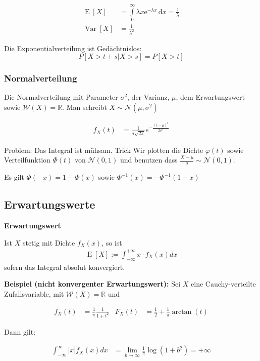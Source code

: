\documentclass[25pt]{sciposter}
\newcommand{\R}{\mathbb{R}}
\newcommand{\W}{\mathcal{W}}
\newcommand{\Nor}{\mathcal{N}}
\newcommand{\Var}{\operatorname{Var}}
\newcommand{\E}{\operatorname{E}}
\newenvironment{method}[1]{\begin{mdframed}[backgroundcolor=blue!10,innertopmargin=15pt, innerbottommargin=15pt,nobreak=true]
		\textbf{#1 }
	}
	{ 
	\end{mdframed}
}
\begin{document}
\begin{multicols}{3}
\begin{align*}
	\E[X]&=\int \limits _{0}^{\infty }\lambda x{\mathrm  {e}}^{{-\lambda x}}\,{\mathrm  {d}}x={\frac  {1}{\lambda }}\\
	\Var[X] &= \frac{1}{\lambda^2}
\end{align*}

Die Exponentialverteilung ist Gedächtnislos: 
$$P[X > t+s| X > s] = P[X > t]$$


\subsubsection*{Normalverteilung}
Die Normalverteilung mit Parameter $\sigma^2$, der Varianz, $\mu$, dem Erwartungswert sowie $\W(X) = \R$. Man schreibt $X\sim \Nor(\mu,\sigma^2)$

\begin{align*}
f_X(t) &= \frac{1}{\sigma\sqrt{2\pi}}e^{-\frac{(t-\mu)^2}{2\sigma^2}}
\end{align*}

Problem: Das Integral ist mühsam. Trick Wir plotten die Dichte $\varphi(t)$ sowie Verteilfunktion $\Phi(t)$ von $\Nor(0,1)$ und benutzen dass $\frac{X-\mu}{\sigma} \sim \Nor(0,1)$.

Es gilt $\Phi(-x) = 1 - \Phi(x)$ sowie ${\Phi^{-1}(x) = -\Phi^{-1}(1-x)}$


\subsection*{Erwartungswerte}

\begin{method}{Erwartungswert}
	Ist $X$ stetig mit Dichte $f_X(x)$, so ist
	\begin{align*}
		\E[X]:= \int_{-\infty}^{+\infty} x\cdot f_X(x) dx
	\end{align*}
	sofern das Integral absolut konvergiert.
\end{method}

\textbf{Beispiel (nicht konvergenter Erwartungswert):}
Sei $X$ eine Cauchy-verteilte Zufallsvariable, mit $\W(X) = \R$ und

\begin{align*}
f_X(t) &= \frac{1}{\pi} \frac{1}{1+t^2}
& 
F_X(t) &= \frac{1}{2} + \frac{1}{\pi}\arctan(t)
\end{align*}

Dann gilt:

\begin{align*}
	\int_{-\infty}^\infty |x|f_X(x) dx &= \lim\limits_{b\to\infty} \frac{1}{\pi}\log(1+b^2) = +\infty
\end{align*}




\end{multicols}
\end{document}
